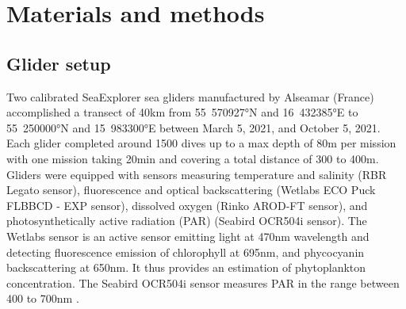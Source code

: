 \documentclass[../Main.tex]{subfiles}
\begin{document}
\section{Materials and methods}
\subsection{Glider setup}
Two calibrated SeaExplorer sea gliders manufactured by Alseamar (France) accomplished a transect of \si{40}{km} from \si{55.570927}{°N} and \si{16.432385}{°E} to \si{55.250000}{°N} and \si{15.983300}{°E} between March 5, 2021, and October 5, 2021. 
Each glider completed around 1500 dives up to a max depth of \si{80}{m} per mission with one mission taking 20min and covering a total distance of 300 to \si{400}{m}.  
\\ 
Gliders were equipped with sensors measuring temperature and salinity (RBR Legato sensor), fluorescence and optical backscattering (Wetlabs ECO Puck FLBBCD - EXP sensor), dissolved oxygen (Rinko AROD-FT sensor), and photosynthetically active radiation (PAR) (Seabird OCR504i sensor). 
The Wetlabs sensor is an active sensor emitting light at \si{470}{nm} wavelength and detecting fluorescence emission of chlorophyll at \si{695}{nm}, and phycocyanin backscattering at \si{650}{nm}. 
It thus provides an estimation of phytoplankton concentration. 
The Seabird OCR504i sensor measures PAR in the range between 400 to \si{700}{nm} \cite{Alseamar2020}.
\end{document}

